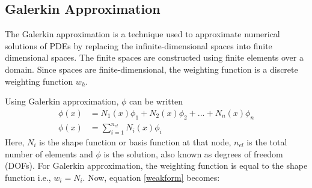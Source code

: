 \documentclass[12pt, oneside]{article}
\begin{document}
\subsection{Galerkin Approximation}
The Galerkin approximation is a technique used to approximate numerical solutions of PDEs by replacing the infinite-dimensional spaces into finite dimensional spaces. The finite spaces are constructed using finite elements over a domain. Since spaces are finite-dimensional, the weighting function is a discrete weighting function $w_h$.

Using Galerkin approximation, $\phi$ can be written
\begin{equation}
    \begin{aligned}
	\phi(x) &= N_1(x)\phi_1 + N_2(x)\phi_2 + ... + N_n(x)\phi_n\\
	\phi \left(x\right) &= \sum_{i=1}^{n_{el}} N_i \left(x\right) \phi_i	
    \end{aligned}
\end{equation}
Here, $N_i$ is the shape function or basis function at that node, $n_{el}$ is the total number of elements and $\phi$ is the solution, also known as degrees of freedom (DOFs). For Galerkin approximation, the weighting function is equal to the shape function i.e., $w_i = N_i$. Now, equation \ref{weakform} becomes:
\begin{equation}

\end{equation}
\end{document}
